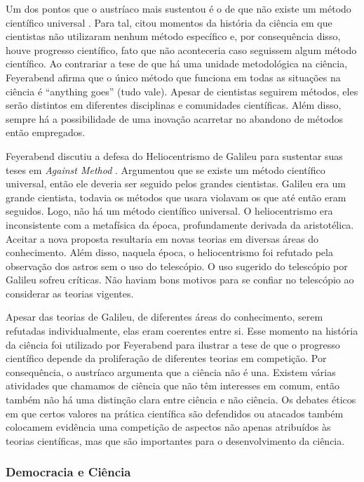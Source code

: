 \documentclass[12pt]{report}
\begin{document}
			Um dos pontos que o austríaco mais sustentou é o de que não existe um método científico universal \cite{feyerabend-against-method}.
			Para tal, citou momentos da história da ciência em que cientistas não utilizaram nenhum método específico e, por consequência disso, houve progresso científico, fato que não aconteceria caso seguissem algum método científico.
			Ao contrariar a tese de que há uma unidade metodológica na ciência, Feyerabend afirma que o único método que funciona em todas as situações na ciência é ``anything goes'' (tudo vale).
			Apesar de cientistas seguirem métodos, eles serão distintos em diferentes disciplinas e comunidades científicas.
			Além disso, sempre há a possibilidade de uma inovação acarretar no abandono de métodos então empregados.
			
			Feyerabend discutiu a defesa do Heliocentrismo de Galileu para sustentar suas teses em \textit{Against Method} \cite{feyerabend-against-method}.
			Argumentou que se existe um método científico universal, então ele deveria ser seguido pelos grandes cientistas.
			Galileu era um grande cientista, todavia os métodos que usara violavam os que até então eram seguidos.
			Logo, não há um método científico universal.
			O heliocentrismo era inconsistente com a metafísica da época, profundamente derivada da aristotélica.
			Aceitar a nova proposta resultaria em novas teorias em diversas áreas do conhecimento.
			Além disso, naquela época, o heliocentrismo foi refutado pela observação dos astros sem o uso do telescópio.
			O uso sugerido do telescópio por Galileu sofreu críticas.
			Não haviam bons motivos para se confiar no telescópio ao considerar as teorias vigentes.
			
			Apesar das teorias de Galileu, de diferentes áreas do conhecimento, serem refutadas individualmente, elas eram coerentes entre si.
			Esse momento na história da ciência foi utilizado por Feyerabend para ilustrar a tese de que o progresso científico depende da proliferação de diferentes teorias em competição.
			Por consequência, o austríaco argumenta que a ciência não é una.
			Existem várias atividades que chamamos de ciência que não têm interesses em comum, então também não há uma distinção clara entre ciência e não ciência.
			Os debates éticos em que certos valores na prática científica são defendidos ou atacados também colocamem evidência uma competição de aspectos não apenas atribuídos às teorias científicas, mas que são importantes para o desenvolvimento da ciência.
			
		\subsubsection{Democracia e Ciência}
		
\end{document}
